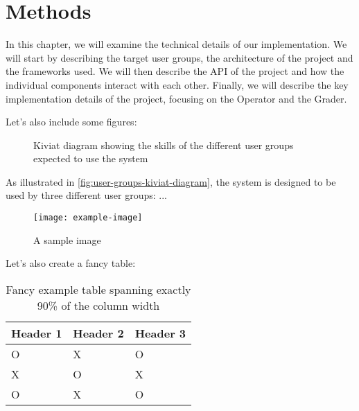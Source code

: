 \documentclass[../paper.tex]{subfiles}
\begin{document}
    \section{Methods}\label{ch:methods}
    In this chapter, we will examine the technical details of our implementation. We will start by describing the target user groups, the architecture of the project and the frameworks used. We will then describe the API of the project and how the individual components interact with each other. Finally, we will describe the key implementation details of the project, focusing on the Operator and the Grader.

    Let's also include some figures:

    \begin{figure}[ht!]
        \centering
        
        \caption{Kiviat diagram showing the skills of the different user groups expected to use the system}
        \label{fig:user-groups-kiviat-diagram}
    \end{figure}
    \FloatBarrier{}

    As illustrated in \autoref{fig:user-groups-kiviat-diagram}, the system is designed to be used by three different user groups: ...
    \begin{figure}[ht!]
        \centering
        \texttt{[image: example-image]}
        \caption{A sample image}
        \label{fig:sample-image}
    \end{figure}

    Let's also create a fancy table:
    \begin{table}[ht]
        \centering
        \begin{tabularx}{.9\columnwidth}{|l|l|X|}
            \toprule
            \textbf{\textsf{Header 1}} & \textbf{\textsf{Header 2}} & \textbf{\textsf{Header 3}} \\
            \midrule
            O                          & X                          & O                          \\
            X                          & O                          & X                          \\
            O                          & X                          & O                          \\
            \bottomrule
        \end{tabularx}
        \caption{Fancy example table spanning exactly 90\% of the column width}
        \label{tab:example-table}
    \end{table}
\end{document}
